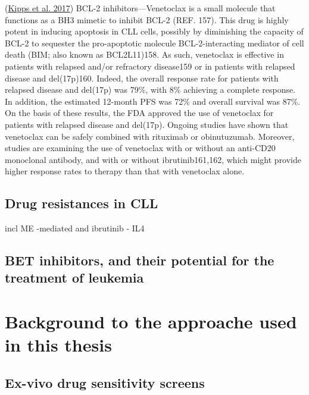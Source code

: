 \documentclass[11pt, a4paper, twosided]{book}
\begin{document}
(\protect\hyperlink{ref-Kipps2017}{Kipps et al. 2017})
BCL-2 inhibitors---Venetoclax is a small molecule that functions as a BH3 mimetic to inhibit BCL-2 (REF. 157). This drug is highly potent in inducing apoptosis in CLL cells, possibly by diminishing the capacity of BCL-2 to sequester the pro-apoptotic molecule BCL-2-interacting mediator of cell death (BIM; also known as BCL2L11)158. As such, venetoclax is effective in patients with relapsed and/or refractory disease159 or in patients with relapsed disease and del(17p)160. Indeed, the overall response rate for patients with relapsed disease and del(17p) was 79\%, with 8\% achieving a complete response. In addition, the estimated 12-month PFS was 72\% and overall survival was 87\%. On the basis of these results, the FDA approved the use of venetoclax for patients with relapsed disease and del(17p). Ongoing studies have shown that venetoclax can be safely combined with rituximab or obinutuzumab. Moreover, studies are examining the use of venetoclax with or without an anti-CD20 monoclonal antibody, and with or without ibrutinib161,162, which might provide higher response rates to therapy than that with venetoclax alone.

\hypertarget{drug-resistances-in-cll}{%
\subsection{Drug resistances in CLL}\label{drug-resistances-in-cll}}

incl ME -mediated and ibrutinib - IL4

\hypertarget{bet-inhibitors-and-their-potential-for-the-treatment-of-leukemia}{%
\subsection{BET inhibitors, and their potential for the treatment of leukemia}\label{bet-inhibitors-and-their-potential-for-the-treatment-of-leukemia}}

\hypertarget{background-to-the-approache-used-in-this-thesis}{%
\section{Background to the approache used in this thesis}\label{background-to-the-approache-used-in-this-thesis}}

\hypertarget{ex-vivo-drug-sensitivity-screens}{%
\subsection{Ex-vivo drug sensitivity screens}\label{ex-vivo-drug-sensitivity-screens}}
\end{document}
